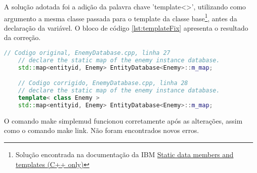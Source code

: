 A solução adotada foi a adição da palavra chave 'template<>', utilizando como argumento a mesma 
classe passada para o template da classe base\footnote{Solução encontrada na documentação da IBM 
\href{https://www.ibm.com/docs/en/zos/2.4.0?topic=only-static-data-members-templates-c}
{Static data members and templates (C++ only)}}, antes da declaração da variável. 
O bloco de código \ref{lst:templateFix} apresenta o resultado da correção.

\begin{lstlisting}[breaklines, label={lst:templateFix}, caption={Correção da declaração das variáveis estáticas}, language=C++]
    // Codigo original, EnemyDatabase.cpp, linha 27
    // declare the static map of the enemy instance database.
    std::map<entityid, Enemy> EntityDatabase<Enemy>::m_map;

    // Codigo corrigido, EnemyDatabase.cpp, linha 28
    // declare the static map of the enemy instance database.
    template< class Enemy >
    std::map<entityid, Enemy> EntityDatabase<Enemy>::m_map;
\end{lstlisting}

O comando make simplemud funcionou corretamente após as alterações, assim como o comando make link.
Não foram encontrados novos erros.
